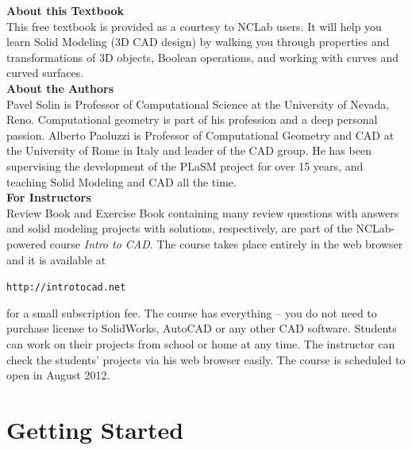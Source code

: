 \documentclass{article}
\begin{document}

\vbox{}
\vfill
{
\noindent
{\bf About this Textbook}\\[4mm]
This free textbook is provided as a courtesy to NCLab users. 
It will help you learn Solid Modeling (3D CAD design) by walking you  
through properties and transformations of 3D objects, Boolean operations, and working 
with curves and curved surfaces. \\[12mm]

\noindent
{\bf About the Authors}\\[4mm]
Pavel Solin is Professor of Computational Science at the University of Nevada, Reno. 
Computational geometry is part of his profession and a deep personal passion. 
Alberto Paoluzzi is Professor of Computational Geometry and CAD at the University 
of Rome in Italy and leader of the CAD group. He has been supervising the development of the PLaSM 
project for over 15 years, and teaching Solid Modeling and CAD all the time. \\[12mm]

\noindent
{\bf For Instructors}\\[4mm]
Review Book and Exercise Book containing many review questions with answers 
and solid modeling projects with solutions, respectively, are part of the 
NCLab-powered course {\em Intro to CAD}. The course takes place entirely in
the web browser and it is available at \\

{\color{blue}
\centerline{\tt http://introtocad.net}
}
\vspace{5mm}

\noindent
for a small subscription fee. The course has everything -- you do not need to 
purchase license to SolidWorks, AutoCAD or any other CAD software. Students 
can work on their projects from school or home at any time.
The instructor can check the students' projects via his web browser easily.
The course is scheduled to open in August 2012.
}
\vfill


\newpage
\setcounter{tocdepth}{2}
\tableofcontents


\newpage

\pagestyle{plain}
\setcounter{page}{1}

\section{Getting Started}
\end{document}
